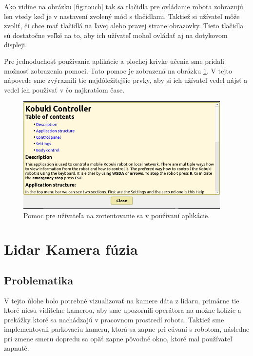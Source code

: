 Ako vidine na obrázku \ref{fig:touch} tak sa tlačidla pre ovládanie robota zobrazujú len vtedy keď je v nastavení
zvolený mód s tlačidlami. Taktiež si užívateľ môže zvoliť, či chce mať tlačidlá na ľavej alebo pravej strane obrazovky.
Tieto tlačidla sú dostatočne veľké na to, aby ich užívateľ mohol ovládať aj na dotykovom displeji.

Pre jednoduchosť používania aplikácie a plochej krivke učenia sme pridali možnosť zobrazenia pomoci.
Tato pomoc je zobrazená na obrázku \ref{fig:help}. V tejto nápovede sme zvýraznili tie najdôležitejšie prvky,
aby si ich užívateľ vedel nájsť a vedel ich použivať v čo najkratšom čase.

\begin{figure}[!htbp]
	\begin{center}
		\includegraphics[width=0.95\textwidth]{img/help.png}
	\end{center}
	\caption{Pomoc pre užívateľa na zorientovanie sa v používaní aplikácie.}
	\label{fig:help}
\end{figure}

\section{Lidar Kamera fúzia}

\subsection{Problematika}
V tejto úlohe bolo potrebné vizualizovať na kamere dáta z lidaru, primárne tie ktoré niesu viditeľne kamerou, aby sme upozornili
operátora na možne kolízie a prekážky ktoré sa nachádzajú v pracovnom prostredí robota. Taktiež sme implementovali parkovaciu
kameru, ktorá sa zapne pri cúvaní s robotom, následne pri zmene smeru dopredu sa opäť zapne pôvodné okno, ktoré mal používateľ
zapnuté.

